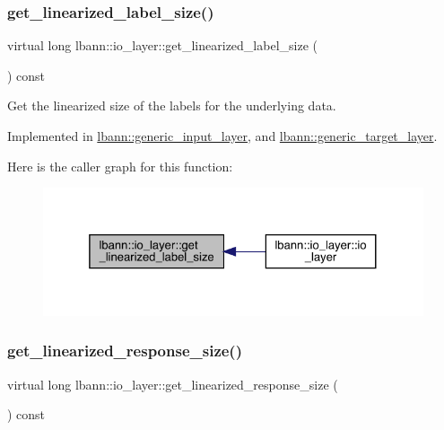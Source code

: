 \subsubsection{\texorpdfstring{get\+\_\+linearized\+\_\+label\+\_\+size()}{get\_linearized\_label\_size()}}
{\footnotesize\ttfamily virtual long lbann\+::io\+\_\+layer\+::get\+\_\+linearized\+\_\+label\+\_\+size (\begin{DoxyParamCaption}{ }\end{DoxyParamCaption}) const\hspace{0.3cm}{\ttfamily [pure virtual]}}

Get the linearized size of the labels for the underlying data. 

Implemented in \hyperlink{classlbann_1_1generic__input__layer_ab6c24db7e2b8e73e7d7894e51246dc5e}{lbann\+::generic\+\_\+input\+\_\+layer}, and \hyperlink{classlbann_1_1generic__target__layer_a8a266291fb01fbcec5cac5fefdef56eb}{lbann\+::generic\+\_\+target\+\_\+layer}.

Here is the caller graph for this function\+:\nopagebreak
\begin{figure}[H]
\begin{center}
\leavevmode
\includegraphics[width=325pt]{classlbann_1_1io__layer_a72a9a1411892b6f03de8b8f9923d77a6_icgraph}
\end{center}
\end{figure}
\mbox{\label{classlbann_1_1io__layer_acbc2723e37e911eef6a38caa02c9e708}} 
\subsubsection{\texorpdfstring{get\+\_\+linearized\+\_\+response\+\_\+size()}{get\_linearized\_response\_size()}}
{\footnotesize\ttfamily virtual long lbann\+::io\+\_\+layer\+::get\+\_\+linearized\+\_\+response\+\_\+size (\begin{DoxyParamCaption}{ }\end{DoxyParamCaption}) const\hspace{0.3cm}{\ttfamily [pure virtual]}}



